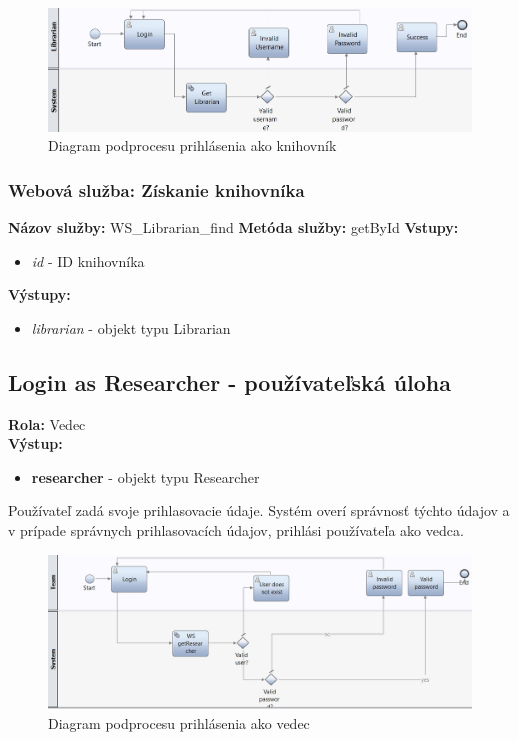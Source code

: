 \documentclass[10pt,oneside,slovak,a4paper]{article}
\begin{document}
\begin{figure} [H]
\centering
\includegraphics[scale=0.4]{diagrams/diagLoginLibrarian.jpg} 
\caption{Diagram podprocesu prihlásenia ako knihovník}
\end{figure}

\subsubsection{Webová služba: Získanie knihovníka}
\textbf{Názov služby:} WS\_Librarian\_find
\textbf{Metóda služby:} getById
\textbf{Vstupy:}
	\begin{itemize}
		\item \textit{id} - ID knihovníka
	\end{itemize}
\textbf{Výstupy:}
	\begin{itemize}
		\item \textit{librarian} - objekt typu Librarian
	\end{itemize}
	
\subsection{Login as Researcher - používateľská úloha}
\textbf{Rola:} Vedec\\
\textbf{Výstup:}

\begin{itemize}
\item \textbf{researcher} - objekt typu Researcher
\end{itemize}

Používateľ zadá svoje prihlasovacie údaje. Systém overí správnosť týchto údajov a v prípade správnych prihlasovacích údajov, prihlási používateľa ako vedca.

\begin{figure} [H]
\centering
\includegraphics[scale=0.4]{diagrams/diagLoginResearcher.jpg} 
\caption{Diagram podprocesu prihlásenia ako vedec}
\end{figure}
\end{document}
